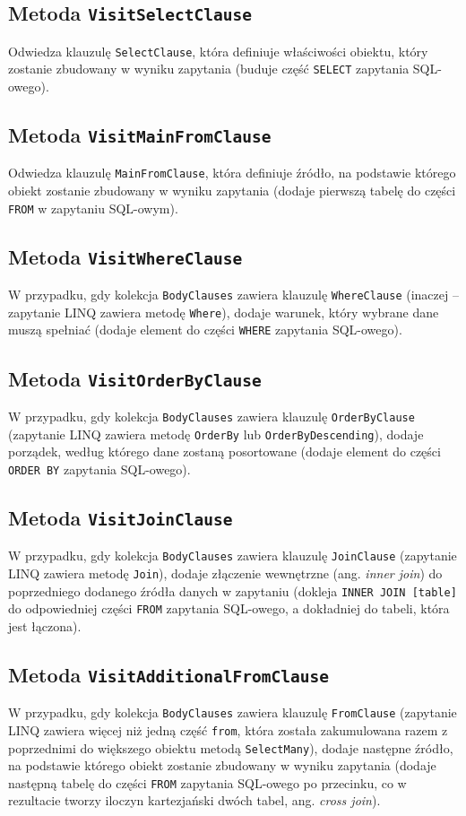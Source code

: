 \subsection{Metoda \texttt{VisitSelectClause}}
Odwiedza klauzulę \texttt{SelectClause}, która definiuje właściwości obiektu, który zostanie zbudowany w wyniku zapytania (buduje część \texttt{SELECT} zapytania SQL-owego).

\subsection{Metoda \texttt{VisitMainFromClause}}
Odwiedza klauzulę \texttt{MainFromClause}, która definiuje źródło, na podstawie którego obiekt zostanie zbudowany w wyniku zapytania (dodaje pierwszą tabelę do części \texttt{FROM} w zapytaniu SQL-owym).

\subsection{Metoda \texttt{VisitWhereClause}}
W przypadku, gdy kolekcja \texttt{BodyClauses} zawiera klauzulę \texttt{WhereClause} (inaczej – zapytanie LINQ zawiera metodę \texttt{Where}), dodaje warunek, który wybrane dane muszą spełniać (dodaje element do części \texttt{WHERE} zapytania SQL-owego).

\subsection{Metoda \texttt{VisitOrderByClause}}
W przypadku, gdy kolekcja \texttt{BodyClauses} zawiera klauzulę \texttt{OrderByClause} (zapytanie LINQ zawiera metodę \texttt{OrderBy} lub \texttt{OrderByDescending}), dodaje porządek, według którego dane zostaną posortowane (dodaje element do części \texttt{ORDER BY} zapytania SQL-owego).

\subsection{Metoda \texttt{VisitJoinClause}}
W przypadku, gdy kolekcja \texttt{BodyClauses} zawiera klauzulę \texttt{JoinClause} (zapytanie LINQ zawiera metodę \texttt{Join}), dodaje złączenie wewnętrzne (ang. \textit{inner join}) do poprzedniego dodanego źródła danych w zapytaniu (dokleja \texttt{INNER JOIN [table]} do odpowiedniej części \texttt{FROM} zapytania SQL-owego, a dokładniej do tabeli, która jest łączona).

\subsection{Metoda \texttt{VisitAdditionalFromClause}}
W przypadku, gdy kolekcja \texttt{BodyClauses} zawiera klauzulę \texttt{FromClause} (zapytanie LINQ zawiera więcej niż jedną część \texttt{from}, która została zakumulowana razem z poprzednimi do większego obiektu metodą \texttt{SelectMany}), dodaje następne źródło, na podstawie którego obiekt zostanie zbudowany w wyniku zapytania (dodaje następną tabelę do części \texttt{FROM} zapytania SQL-owego po przecinku, co w rezultacie tworzy iloczyn kartezjański dwóch tabel, ang. \textit{cross join}).

